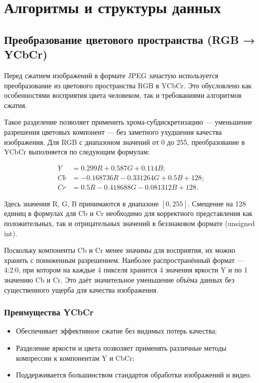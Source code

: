\section{Алгоритмы и структуры данных}
\subsection{Преобразование цветового пространства (RGB → YCbCr)}

Перед сжатием изображений в формате JPEG зачастую используется преобразование из цветового пространства RGB в YCbCr. 
Это обусловлено как особенностями восприятия цвета человеком, так и требованиями алгоритмов сжатия.


Такое разделение позволяет применить хрома-субдискретизацию — уменьшение разрешения цветовых компонент — без заметного ухудшения качества изображения.
Для RGB с диапазоном значений от 0 до 255, преобразование в YCbCr выполняется по следующим формулам:


\begin{equation}
    \begin{aligned}
        Y &= 0.299R + 0.587G + 0.114B; \\
        Cb &= -0.168736R - 0.331264G + 0.5B + 128; \\
        Cr &= 0.5R - 0.418688G - 0.081312B + 128.
    \end{aligned}
\end{equation}


Здесь значения R, G, B принимаются в диапазоне $[0, 255]$. 
Смещение на 128 единиц в формулах для Cb и Cr необходимо для корректного представления как положительных, так и отрицательных значений в беззнаковом формате (unsigned int).

Поскольку компоненты Cb и Cr менее значимы для восприятия, их можно хранить с пониженным разрешением. 
Наиболее распространённый формат — 4:2:0, при котором на каждые 4 пикселя хранится 4 значения яркости Y и по 1 значению Cb и Cr. 
Это даёт значительное уменьшение объёма данных без существенного ущерба для качества изображения.



\subsubsection{Преимущества YCbCr}
    \begin{itemize}
        \item Обеспечивает эффективное сжатие без видимых потерь качества;
        \item Разделение яркости и цвета позволяет применять различные методы компрессии к компонентам Y и CbCr;
        \item Поддерживается большинством стандартов обработки изображений и видео.
    \end{itemize}

